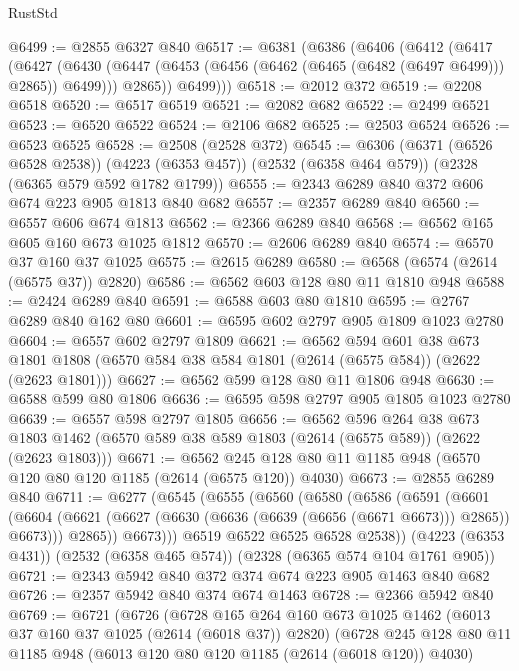 \begin{lexlean}{RustStd}
\begin{coremodule}
@6499 := @2855 @6327 @840
@6517 := @6381
    (@6386
      (@6406
        (@6412
          (@6417
            (@6427
              (@6430 (@6447 (@6453 (@6456 (@6462 (@6465 (@6482 (@6497 @6499))) @2865)) @6499)))
              @2865))
          @6499)))
@6518 := @2012 @372
@6519 := @2208 @6518
@6520 := @6517 @6519
@6521 := @2082 @682
@6522 := @2499 @6521
@6523 := @6520 @6522
@6524 := @2106 @682
@6525 := @2503 @6524
@6526 := @6523 @6525
@6528 := @2508 (@2528 @372)
@6545 := @6306
    (@6371 (@6526 @6528 @2538))
    (@4223 (@6353 @457))
    (@2532 (@6358 @464 @579))
    (@2328 (@6365 @579 @592 @1782 @1799))
@6555 := @2343 @6289 @840 @372 @606 @674 @223 @905 @1813 @840 @682
@6557 := @2357 @6289 @840
@6560 := @6557 @606 @674 @1813
@6562 := @2366 @6289 @840
@6568 := @6562 @165 @605 @160 @673 @1025 @1812
@6570 := @2606 @6289 @840
@6574 := @6570 @37 @160 @37 @1025
@6575 := @2615 @6289
@6580 := @6568 (@6574 (@2614 (@6575 @37)) @2820)
@6586 := @6562 @603 @128 @80 @11 @1810 @948
@6588 := @2424 @6289 @840
@6591 := @6588 @603 @80 @1810
@6595 := @2767 @6289 @840 @162 @80
@6601 := @6595 @602 @2797 @905 @1809 @1023 @2780
@6604 := @6557 @602 @2797 @1809
@6621 := @6562
    @594
    @601
    @38
    @673
    @1801
    @1808
    (@6570 @584 @38 @584 @1801 (@2614 (@6575 @584)) (@2622 (@2623 @1801)))
@6627 := @6562 @599 @128 @80 @11 @1806 @948
@6630 := @6588 @599 @80 @1806
@6636 := @6595 @598 @2797 @905 @1805 @1023 @2780
@6639 := @6557 @598 @2797 @1805
@6656 := @6562
    @596
    @264
    @38
    @673
    @1803
    @1462
    (@6570 @589 @38 @589 @1803 (@2614 (@6575 @589)) (@2622 (@2623 @1803)))
@6671 := @6562 @245 @128 @80 @11 @1185 @948 (@6570 @120 @80 @120 @1185 (@2614 (@6575 @120)) @4030)
@6673 := @2855 @6289 @840
@6711 := @6277
    (@6545
      (@6555
        (@6560
          (@6580
            (@6586
              (@6591
                (@6601
                  (@6604 (@6621 (@6627 (@6630 (@6636 (@6639 (@6656 (@6671 @6673))) @2865)) @6673)))
                  @2865))
              @6673)))
        @6519
        @6522
        @6525
        @6528
        @2538))
    (@4223 (@6353 @431))
    (@2532 (@6358 @465 @574))
    (@2328 (@6365 @574 @104 @1761 @905))
@6721 := @2343 @5942 @840 @372 @374 @674 @223 @905 @1463 @840 @682
@6726 := @2357 @5942 @840 @374 @674 @1463
@6728 := @2366 @5942 @840
@6769 := @6721
    (@6726
      (@6728
        @165
        @264
        @160
        @673
        @1025
        @1462
        (@6013 @37 @160 @37 @1025 (@2614 (@6018 @37)) @2820)
        (@6728
          @245
          @128
          @80
          @11
          @1185
          @948
          (@6013 @120 @80 @120 @1185 (@2614 (@6018 @120)) @4030)

\end{coremodule}
\end{lexlean}
